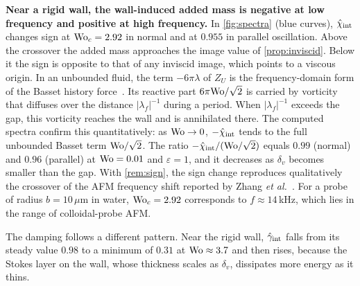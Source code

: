 \textbf{Near a rigid wall, the wall-induced added mass is negative at low frequency and positive at high frequency.} In
\cref{fig:spectra} (blue curves), $\hat\chi_{\rm int}$ changes sign at $\mathrm{Wo}_c=2.92$ in normal and at $0.955$ in parallel
oscillation. Above the crossover the added mass approaches the image value of \cref{prop:inviscid}. Below it the sign
is opposite to that of any inviscid image, which points to a viscous origin. In an unbounded fluid, the term
$-6\pi\lambda$ of $Z_U$ is the frequency-domain form of the Basset history force~\cite{maxey1983equation}. Its reactive
part $6\pi\mathrm{Wo}/\sqrt2$ is carried by vorticity that diffuses over the distance $|\lambda_f|^{-1}$ during a period. When
$|\lambda_f|^{-1}$ exceeds the gap, this vorticity reaches the wall and is annihilated there. The computed spectra
confirm this quantitatively: as $\mathrm{Wo}\to0$, $-\hat\chi_{\rm int}$ tends to the full unbounded Basset term $\mathrm{Wo}/\sqrt2$.
The ratio $-\hat\chi_{\rm int}/(\mathrm{Wo}/\sqrt2)$ equals $0.99$ (normal) and $0.96$ (parallel) at $\mathrm{Wo}=0.01$ and
$\varepsilon=1$, and it decreases as $\delta_v$ becomes smaller than the gap.  With
\cref{rem:sign}, the sign change reproduces qualitatively the crossover of the AFM frequency shift reported by Zhang
\emph{et al.}~\cite{zhang2023unsteady}. For a probe of radius $b=10\,\mu$m in water, $\mathrm{Wo}_c=2.92$ corresponds to
$f\approx14$\,kHz, which lies in the range of colloidal-probe AFM.

The damping follows a different pattern. Near the rigid wall, $\hat\gamma_{\rm int}$ falls from its steady value $0.98$
to a minimum of $0.31$ at $\mathrm{Wo}\approx3.7$ and then rises, because the Stokes layer on the wall, whose thickness scales
as $\delta_v$, dissipates more energy as it thins.

